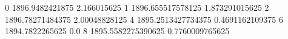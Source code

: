 0 1896.9482421875 2.166015625
1 1896.655517578125 1.873291015625
2 1896.78271484375 2.00048828125
4 1895.2513427734375 0.4691162109375
6 1894.7822265625 0.0
8 1895.5582275390625 0.7760009765625

